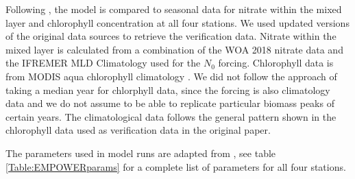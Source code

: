 \documentclass[journal abbreviation, manuscript]{copernicus}
\begin{document}
Following \citet{Anderson2015c}, the model is compared to seasonal data for nitrate within the mixed layer and chlorophyll concentration at all four stations. We used updated versions of the original data sources to retrieve the verification data. Nitrate within the mixed layer is calculated from a combination of the WOA 2018 nitrate data and the IFREMER MLD Climatology used for the $N_0$ forcing. Chlorophyll data is from MODIS aqua chlorophyll climatology \citep{NASAGoddardSpaceFlightCenterOceanEcologyLaboratoryOceanBiologyProcessingGroup}. We did not follow the approach of taking a median year for chlorphyll data, since the forcing is also climatology data and we do not assume to be able to replicate particular biomass peaks of certain years. The climatological data follows the general pattern shown in the chlorophyll data used as verification data in the original paper.


The parameters used in model runs are adapted from \citet{Anderson2015c}, see table \ref{Table:EMPOWERparams} for a complete list of parameters for all four stations.
\end{document}
